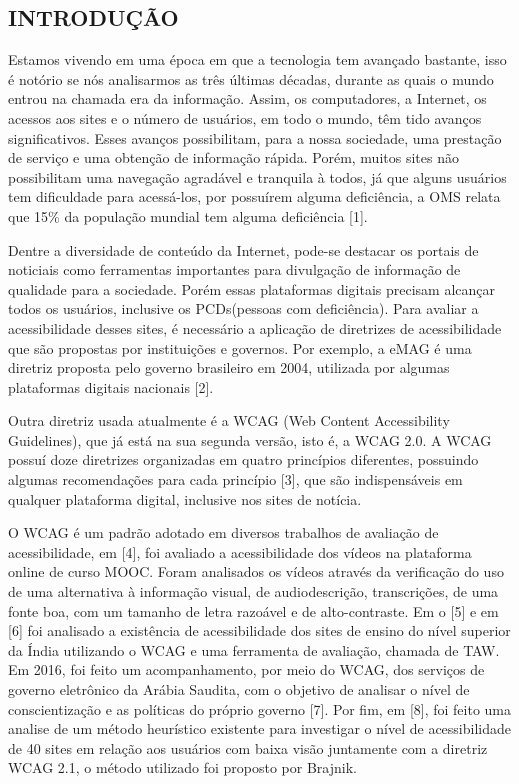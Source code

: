 \documentclass[a4paper]{article}
\begin{document}
\begin{titlepage}
	\begin{center}
		\tableofcontents
	\end{center}
\end{titlepage}
\begin{titlepage}
\section{INTRODUÇÃO}
\fontsize{12pt}{0pt}\selectfont
\onehalfspacing
Estamos vivendo em uma época em que a tecnologia tem avançado bastante, isso é notório se nós analisarmos as três últimas décadas, durante as quais o mundo entrou na chamada era da informação. Assim, os computadores, a Internet, os acessos aos sites e o número de usuários, em todo o mundo, têm tido avanços significativos. Esses avanços possibilitam, para a nossa sociedade, uma prestação de serviço e uma obtenção de informação rápida. Porém, muitos sites não possibilitam uma navegação agradável e tranquila à todos, já que alguns usuários tem dificuldade para acessá-los, por possuírem alguma deficiência, a OMS relata que 15\% da população mundial tem alguma deficiência [1].

Dentre a diversidade de conteúdo da Internet, pode-se destacar os portais de noticiais como ferramentas importantes para divulgação de informação de qualidade para a sociedade. Porém essas plataformas digitais precisam alcançar todos os usuários, inclusive os PCDs(pessoas com deficiência). Para avaliar a acessibilidade desses sites, é necessário a aplicação de diretrizes de acessibilidade que são propostas por instituições e governos. Por exemplo, a eMAG é uma diretriz proposta pelo governo brasileiro em 2004, utilizada por algumas plataformas digitais nacionais [2].

Outra diretriz usada atualmente é a WCAG (Web Content Accessibility Guidelines), que já está na sua segunda versão, isto é, a WCAG 2.0. A WCAG possuí doze diretrizes organizadas em quatro princípios diferentes, possuindo algumas recomendações para cada princípio [3], que são indispensáveis em qualquer plataforma digital, inclusive nos sites de notícia.

O WCAG é um padrão adotado em diversos trabalhos de avaliação de acessibilidade, em [4], foi avaliado a acessibilidade dos vídeos na plataforma online de curso MOOC. Foram analisados os vídeos através da verificação do uso de uma alternativa à informação visual, de audiodescrição, transcrições, de uma fonte boa, com um tamanho de letra razoável e de alto-contraste. Em o [5] e em [6] foi analisado a existência de acessibilidade dos sites de ensino do nível superior da Índia utilizando o WCAG e uma ferramenta de avaliação, chamada de TAW. Em 2016, foi feito um acompanhamento, por meio do WCAG, dos serviços de governo eletrônico da Arábia Saudita, com o objetivo de analisar o nível de conscientização e as políticas do próprio governo [7]. Por fim, em [8], foi feito uma analise de um método heurístico existente para investigar o nível de acessibilidade de 40 sites em relação aos usuários com baixa visão juntamente com a diretriz WCAG 2.1, o método utilizado foi proposto por Brajnik.


\end{titlepage}
\end{document}
